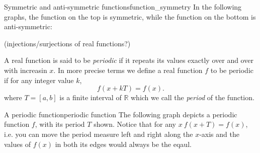 \begin{example}{Symmetric and anti-symmetric functions}{function_symmetry}
	In the following graphs, the function on the top is symmetric, while the function on the bottom is anti-symmetric:
	\begin{figure}[H]
		\centering

	\end{figure}
\end{example}

(injections/surjections of real functions?)
 
A real function is said to be \emph{periodic} if it repeats its values exactly over and over with increasin $x$. In more precise terms we define a real function $f$ to be periodic if for any integer value $k$,
\begin{equation}
	f(x+kT) = f(x).
	\label{eq:periodic function}
\end{equation}
where $T=[a,b]$ is a finite interval of $\mathbb{R}$ which we call the \emph{period} of the function.

\begin{example}{A periodic function}{periodic function}
	The following graph depicts a periodic function $f$, with its period $T$ shown. Notice that for any $x\ f(x+T)=f(x)$, i.e. you can move the period measure left and right along the $x$-axis and the values of $f(x)$ in both its edges would always be the eqaul.

	\centering
\end{example}

